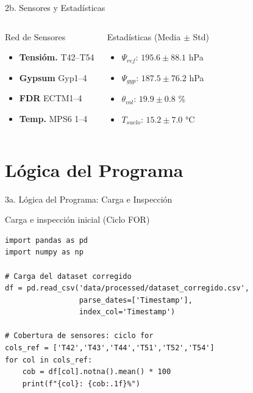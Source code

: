 \documentclass[11pt, aspectratio=169]{beamer}
\begin{document}
\begin{frame}{2b. Sensores y Estadísticas}
\begin{columns}[c]
\begin{exampleblock}{Red de Sensores}
\begin{itemize}
    \item \textbf{Tensióm.} T42--T54
    \item \textbf{Gypsum} Gyp1--4
    \item \textbf{FDR} ECTM1--4
    \item \textbf{Temp.} MPS6 1--4
\end{itemize}
\end{exampleblock}

\begin{block}{Estadísticas (Media $\pm$ Std)}
\begin{itemize}
    \item $\Psi_{ref}$: $195.6 \pm 88.1$ hPa
    \item $\Psi_{gyp}$: $187.5 \pm 76.2$ hPa
    \item $\theta_{vol}$: $19.9 \pm 0.8$ \%
    \item $T_{suelo}$: $15.2 \pm 7.0$ °C
\end{itemize}
\end{block}
\end{columns}
\end{frame}

\section{Lógica del Programa}

\begin{frame}[fragile]{3a. Lógica del Programa: Carga e Inspección}
\begin{block}{Carga e inspección inicial (Ciclo FOR)}
\begin{lstlisting}[numbers=none,frame=none,basicstyle=\ttfamily\small]
import pandas as pd
import numpy as np

# Carga del dataset corregido
df = pd.read_csv('data/processed/dataset_corregido.csv',
                 parse_dates=['Timestamp'],
                 index_col='Timestamp')

# Cobertura de sensores: ciclo for
cols_ref = ['T42','T43','T44','T51','T52','T54']
for col in cols_ref:
    cob = df[col].notna().mean() * 100
    print(f"{col}: {cob:.1f}%")
\end{lstlisting}
\end{block}
\end{frame}
\end{document}
